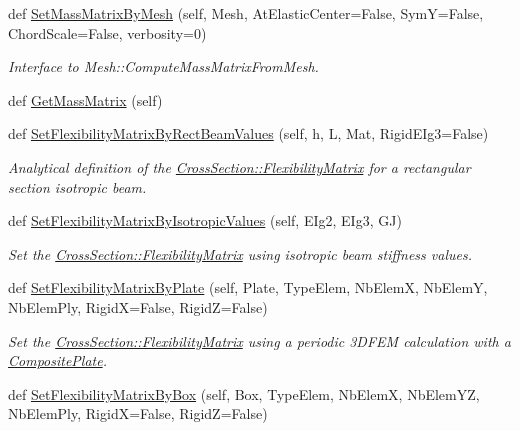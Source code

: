 \begin{DoxyCompactItemize}
def \hyperlink{classgebtaero_1_1_cross_section_1_1_cross_section_a51f5f560da9f747310ebc55db72fd353}{Set\+Mass\+Matrix\+By\+Mesh} (self, Mesh, At\+Elastic\+Center=False, SymY=False, Chord\+Scale=False, verbosity=0)
\begin{DoxyCompactList}\small\item\em Interface to Mesh\+::\+Compute\+Mass\+Matrix\+From\+Mesh. \end{DoxyCompactList}\item 
def \hyperlink{classgebtaero_1_1_cross_section_1_1_cross_section_a329e4ccf313b33bf8fd5a1af65d95d0f}{Get\+Mass\+Matrix} (self)
\item 
def \hyperlink{classgebtaero_1_1_cross_section_1_1_cross_section_ae470ab0c1773947882a762c5e36351d5}{Set\+Flexibility\+Matrix\+By\+Rect\+Beam\+Values} (self, h, L, Mat, Rigid\+E\+Ig3=False)
\begin{DoxyCompactList}\small\item\em Analytical definition of the \hyperlink{classgebtaero_1_1_cross_section_1_1_cross_section_ac20eafaf38ff757f9a8c9ae89212396a}{Cross\+Section\+::\+Flexibility\+Matrix} for a rectangular section isotropic beam. \end{DoxyCompactList}\item 
def \hyperlink{classgebtaero_1_1_cross_section_1_1_cross_section_a8e1902ba4dd5fbdb184868b55b663ebc}{Set\+Flexibility\+Matrix\+By\+Isotropic\+Values} (self, E\+Ig2, E\+Ig3, GJ)
\begin{DoxyCompactList}\small\item\em Set the \hyperlink{classgebtaero_1_1_cross_section_1_1_cross_section_ac20eafaf38ff757f9a8c9ae89212396a}{Cross\+Section\+::\+Flexibility\+Matrix} using isotropic beam stiffness values. \end{DoxyCompactList}\item 
def \hyperlink{classgebtaero_1_1_cross_section_1_1_cross_section_a1f7fe7afe016bebd24eb42a7199df862}{Set\+Flexibility\+Matrix\+By\+Plate} (self, Plate, Type\+Elem, Nb\+ElemX, Nb\+ElemY, Nb\+Elem\+Ply, RigidX=False, RigidZ=False)
\begin{DoxyCompactList}\small\item\em Set the \hyperlink{classgebtaero_1_1_cross_section_1_1_cross_section_ac20eafaf38ff757f9a8c9ae89212396a}{Cross\+Section\+::\+Flexibility\+Matrix} using a periodic 3\+D\+F\+EM calculation with a \hyperlink{namespacegebtaero_1_1_composite_plate}{Composite\+Plate}. \end{DoxyCompactList}\item 
def \hyperlink{classgebtaero_1_1_cross_section_1_1_cross_section_ac316b6aa8955415debcc2f5dd6e28db6}{Set\+Flexibility\+Matrix\+By\+Box} (self, Box, Type\+Elem, Nb\+ElemX, Nb\+Elem\+YZ, Nb\+Elem\+Ply, RigidX=False, RigidZ=False)

\end{DoxyCompactItemize}
